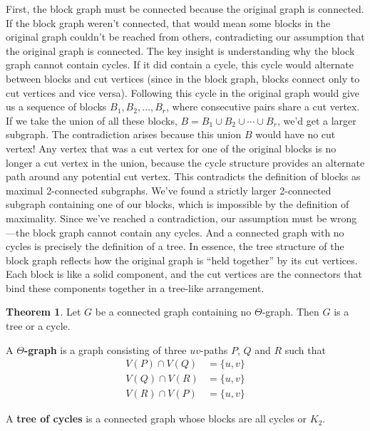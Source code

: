 \documentclass{article}
\theoremstyle{definition}
\newtheorem{theorem}{Theorem}
\begin{document}
First, the block graph must be connected because the original graph is connected. If the block graph weren't connected, that would mean some blocks in the original graph couldn't be reached from others, contradicting our assumption that the original graph is connected. The key insight is understanding why the block graph cannot contain cycles. If it did contain a cycle, this cycle would alternate between blocks and cut vertices (since in the block graph, blocks connect only to cut vertices and vice versa). Following this cycle in the original graph would give us a sequence of blocks $B_1, B_2, \ldots, B_r$, where consecutive pairs share a cut vertex. If we take the union of all these blocks, $B = B_1 \cup B_2 \cup \cdots \cup B_r$, we'd get a larger subgraph. The contradiction arises because this union $B$ would have no cut vertex! Any vertex that was a cut vertex for one of the original blocks is no longer a cut vertex in the union, because the cycle structure provides an alternate path around any potential cut vertex. This contradicts the definition of blocks as maximal 2-connected subgraphs. We've found a strictly larger 2-connected subgraph containing one of our blocks, which is impossible by the definition of maximality. Since we've reached a contradiction, our assumption must be wrong—the block graph cannot contain any cycles. And a connected graph with no cycles is precisely the definition of a tree. In essence, the tree structure of the block graph reflects how the original graph is ``held together'' by its cut vertices. Each block is like a solid component, and the cut vertices are the connectors that bind these components together in a tree-like arrangement.

\begin{theorem}
    

Let $G$ be a connected graph containing no $\Theta$-graph. Then $G$ is a tree or a cycle.

A \textbf{$\Theta$-graph} is a graph consisting of three $uv$-paths $P$, $Q$ and $R$ such that 
\begin{align*}
V(P) \cap V(Q) &= \{u, v\} \\
V(Q) \cap V(R) &= \{u, v\} \\
V(R) \cap V(P) &= \{u, v\}
\end{align*}
\end{theorem}


A \textbf{tree of cycles} is a connected graph whose blocks are all cycles or $K_2$.
\end{document}
